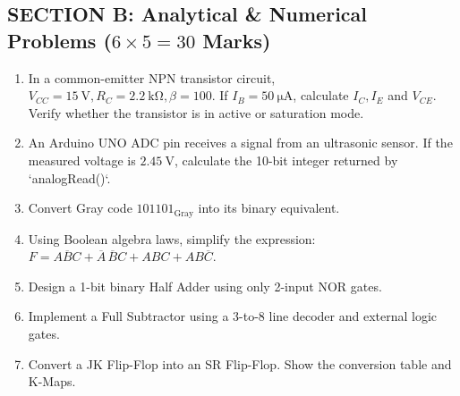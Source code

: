 \subsection*{SECTION B: Analytical \& Numerical Problems ($6 \times 5 = 30$ Marks)}
\begin{enumerate}[label=\textbf{Q\arabic*.}, leftmargin=2em, start=11]
    \item In a common-emitter NPN transistor circuit, $V_{CC} = \SI{15}{\volt}, R_C = \SI{2.2}{\kilo\ohm}, \beta = 100$. If $I_B = \SI{50}{\micro\ampere}$, calculate $I_C, I_E$ and $V_{CE}$. Verify whether the transistor is in active or saturation mode.
    \item An Arduino UNO ADC pin receives a signal from an ultrasonic sensor. If the measured voltage is $\SI{2.45}{\volt}$, calculate the 10-bit integer returned by `analogRead()`.
    \item Convert Gray code $101101_{\text{Gray}}$ into its binary equivalent.
    \item Using Boolean algebra laws, simplify the expression: $F = A\overline{B}C + \overline{A}\,\overline{B}C + ABC + AB\overline{C}$.
    \item Design a 1-bit binary Half Adder using only 2-input NOR gates.
    \item Implement a Full Subtractor using a 3-to-8 line decoder and external logic gates.
    \item Convert a JK Flip-Flop into an SR Flip-Flop. Show the conversion table and K-Maps.
\end{enumerate}

